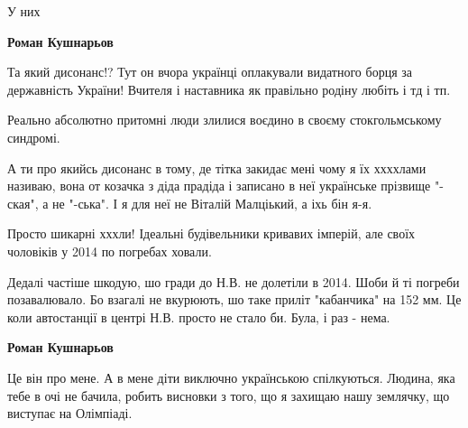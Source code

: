 \begin{itemize}
\begin{itemize}
У них

 
\textbf{Роман Кушнарьов} 

Та який дисонанс!? Тут он вчора українці оплакували видатного борця за
державність України! Вчителя і наставника як правільно родіну любіть і тд і тп.

Реально абсолютно притомні люди злилися воєдино в своєму стокгольмському синдромі.

А ти про якийсь дисонанс в тому, де тітка закидає мені чому я їх ххххлами
називаю, вона от козачка з діда прадіда і записано в неї українське прізвище
"-ская", а не "-ська". І я для неї не Віталій Малціький, а іхь бін я-я.

Просто шикарні хххли! Ідеальні будівельники кривавих імперій, але своїх
чоловіків у 2014 по погребах ховали.

 

Дедалі частіше шкодую, шо гради до Н.В. не долетіли в 2014. Шоби й ті погреби
позавалювало. Бо взагалі не вкурюють, шо таке приліт "кабанчика" на 152 мм. Це
коли автостанції в центрі Н.В. просто не стало би. Була, і раз - нема.


 
\textbf{Роман Кушнарьов} 

Це він про мене. А в мене діти виключно українською спілкуються. Людина, яка
тебе в очі не бачила, робить висновки з того, що я захищаю нашу землячку, що
виступає на Олімпіаді.

 

\end{itemize}
\end{itemize}
